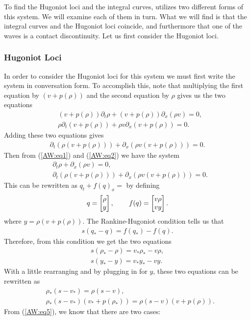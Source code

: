 \documentclass{article}
\begin{document}
To find the Hugoniot loci and the integral curves, \cite{AwRascle2000} utilizes two different forms of this system. 
We will examine each of them in turn. What we will find is that the integral curves and the Hugoniot loci coincide, 
and furthermore that one of the waves is a contact discontinuity. Let us first consider the Hugoniot loci. 

\subsubsection{Hugoniot Loci}
In order to consider the Hugoniot loci for this system we must first write the system in conversation form. 
To accomplish this, note that multiplying the first equation by $(v + p(\rho ))$ and the second equation 
by $\rho$ gives us the two equations 
\begin{align*}
&(v + p(\rho ))\partial_t\rho + (v + p(\rho ))\partial_x(\rho v) = 0,  \\
&\rho\partial_t \left(v + p(\rho )\right) + \rho v\partial_x \left( v + p(\rho )\right) = 0.
\end{align*}
Adding these two equations gives
\begin{align}\label{AW:eq2}
\partial_t \left(\rho\left(v + p(\rho )\right)\right) + \partial_x \left( \rho v\left(v + p(\rho )\right)\right) = 0.
\end{align}
Then from (\ref{AW:eq1}) and (\ref{AW:eq2}) we have the system 
\begin{align*}
&\partial_t\rho + \partial_x(\rho v) = 0, \\
&\partial_t \left(\rho\left(v + p(\rho )\right)\right) + \partial_x \left( \rho v\left(v + p(\rho )\right)\right) = 0.
\end{align*}
This can be rewritten as $q_t + f(q)_x = $ by defining
\begin{align*}
q = \left[ \begin{matrix}
\rho \\ y
\end{matrix}\right], \hspace{0.3in}
f(q) = \left[ \begin{matrix}
v\rho \\
vy
\end{matrix}\right].
\end{align*}
where $y = \rho\left(v + p(\rho )\right)$.
The Rankine-Hugoniot condition tells us that 
\begin{align*}
s(q_*- q) = f(q_*) - f(q).
\end{align*}
Therefore, from this condition we get the two equations
\begin{align}
s(\rho_* - \rho) = v_*\rho_* - v\rho, \label{AW:eq3}\\
s(y_* - y) = v_*y_* - vy.\label{AW:eq4}
\end{align}
With a little rearranging and by plugging in for $y$, these two equations can be rewritten as
\begin{align}
&\rho_*(s - v_*) = \rho (s - v), \label{AW:eq5}\\
&\rho_*(s - v_*)\left(v_* + p(\rho_* )\right) = \rho(s - v)\left(v + p(\rho )\right).
\end{align}
From (\ref{AW:eq5}), we know that there are two cases: 
\end{document}
